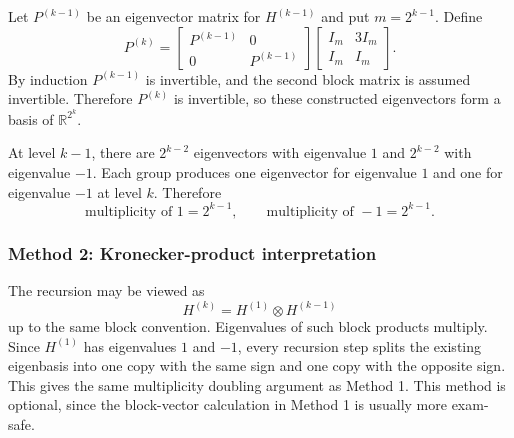 \documentclass[12pt]{article}
\newcommand{\R}{\mathbb{R}}
\begin{document}
Let $P^{(k-1)}$ be an eigenvector matrix for $H^{(k-1)}$ and put $m=2^{k-1}$. Define
\[
P^{(k)}=\begin{bmatrix}P^{(k-1)}&0\\0&P^{(k-1)}\end{bmatrix}
\begin{bmatrix}I_m&3I_m\\I_m&I_m\end{bmatrix}.
\]
By induction $P^{(k-1)}$ is invertible, and the second block matrix is assumed invertible. Therefore $P^{(k)}$ is invertible, so these constructed eigenvectors form a basis of $\R^{2^k}$.

At level $k-1$, there are $2^{k-2}$ eigenvectors with eigenvalue $1$ and $2^{k-2}$ with eigenvalue $-1$. Each group produces one eigenvector for eigenvalue $1$ and one for eigenvalue $-1$ at level $k$. Therefore
\[
\boxed{\text{multiplicity of }1=2^{k-1},
\qquad
\text{multiplicity of }-1=2^{k-1}.}
\]

\subsubsection{Method 2: Kronecker-product interpretation}
The recursion may be viewed as
\[
H^{(k)}=H^{(1)}\otimes H^{(k-1)}
\]
up to the same block convention. Eigenvalues of such block products multiply. Since $H^{(1)}$ has eigenvalues $1$ and $-1$, every recursion step splits the existing eigenbasis into one copy with the same sign and one copy with the opposite sign. This gives the same multiplicity doubling argument as Method 1. This method is optional, since the block-vector calculation in Method 1 is usually more exam-safe.
\end{document}
